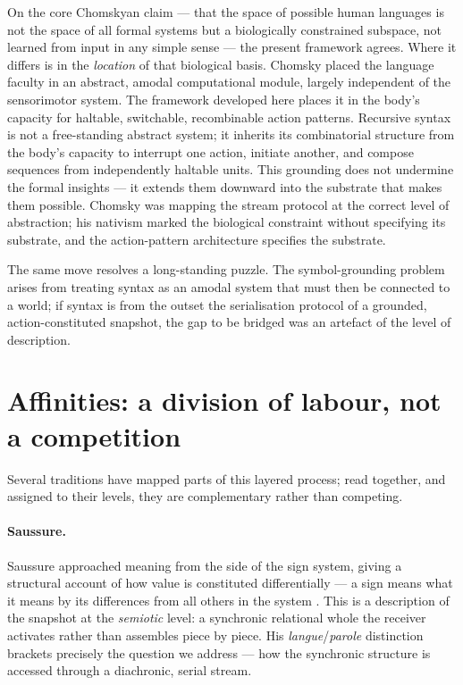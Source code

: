 \documentclass{article}
\begin{document}
On the core Chomskyan claim --- that the space of possible human languages is not the space of all formal systems but a biologically constrained subspace, not learned from input in any simple sense --- the present framework agrees. Where it differs is in the \emph{location} of that biological basis. Chomsky placed the language faculty in an abstract, amodal computational module, largely independent of the sensorimotor system. The framework developed here places it in the body's capacity for haltable, switchable, recombinable action patterns. Recursive syntax is not a free-standing abstract system; it inherits its combinatorial structure from the body's capacity to interrupt one action, initiate another, and compose sequences from independently haltable units. This grounding does not undermine the formal insights --- it extends them downward into the substrate that makes them possible. Chomsky was mapping the stream protocol at the correct level of abstraction; his nativism marked the biological constraint without specifying its substrate, and the action-pattern architecture specifies the substrate.

The same move resolves a long-standing puzzle. The symbol-grounding problem arises from treating syntax as an amodal system that must then be connected to a world; if syntax is from the outset the serialisation protocol of a grounded, action-constituted snapshot, the gap to be bridged was an artefact of the level of description.

\section{Affinities: a division of labour, not a competition}\label{sec:affinities}

Several traditions have mapped parts of this layered process; read together, and assigned to their levels, they are complementary rather than competing.

\paragraph{Saussure.} Saussure approached meaning from the side of the sign system, giving a structural account of how value is constituted differentially --- a sign means what it means by its differences from all others in the system \citep{Saussure1916Course}. This is a description of the snapshot at the \emph{semiotic} level: a synchronic relational whole the receiver activates rather than assembles piece by piece. His \emph{langue}/\emph{parole} distinction brackets precisely the question we address --- how the synchronic structure is accessed through a diachronic, serial stream.
\end{document}
